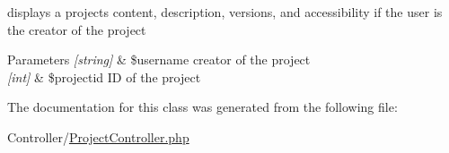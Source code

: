 displays a project\textquotesingle{}s content, description, versions, and accessibility if the user is the creator of the project 


\begin{DoxyParams}{Parameters}
{\em \mbox{[}string\mbox{]}} & \$username creator of the project \\
\hline
{\em \mbox{[}int\mbox{]}} & \$projectid ID of the project \\
\hline
\end{DoxyParams}


The documentation for this class was generated from the following file\+:\begin{DoxyCompactItemize}
\item 
Controller/\hyperlink{_project_controller_8php}{Project\+Controller.\+php}\end{DoxyCompactItemize}
